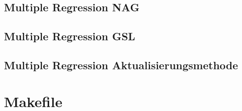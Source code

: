 \documentclass{article}
\begin{document}
\subsection{Multiple Regression NAG}


\subsection{Multiple Regression GSL}


\subsection{Multiple Regression Aktualisierungsmethode}


\section{Makefile}

\end{document}
